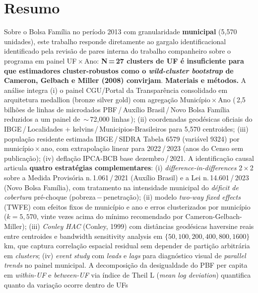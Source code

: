 \documentclass[12pt,a4paper,oneside]{article}
\begin{document}
\section*{Resumo}
\begin{singlespace}\small\noindent
Sobre o Bolsa Família no período 2013 com granularidade
\textbf{municipal} (5{,}570 unidades), este trabalho responde diretamente
ao gargalo identificacional identificado pela revisão de pares interna
do trabalho companheiro sobre o programa em painel UF\,$\times$\,Ano:
\textbf{N\,=\,27 clusters de UF é insuficiente para que estimadores
cluster-robustos como o \textit{wild-cluster bootstrap} de Cameron,
Gelbach e Miller (2008) convirjam}. \textbf{Materiais e métodos.} A
análise integra (i) o painel CGU/Portal da Transparência consolidado em
arquitetura medallion (bronze \textrightarrow{} silver \textrightarrow{}
gold) com agregação Município\,$\times$\,Ano (\,2{,}5\,bilhões de linhas
de microdados PBF\,/\,Auxílio Brasil\,/\,Novo Bolsa Família reduzidos a
um painel de \,$\sim$\,72{,}000 linhas\,); (ii) coordenadas geodésicas
oficiais do IBGE\,/\,Localidades + kelvins\,/\,Municipios-Brasileiros
para 5{,}570 centroides; (iii) população residente estimada
IBGE\,/\,SIDRA Tabela 6579 (variável 9324) por município\,$\times$\,ano,
com extrapolação linear para 2022\,/\,2023 (anos do Censo sem
publicação); (iv) deflação IPCA-BCB base dezembro\,/\,2021. A
identificação causal articula \textbf{quatro estratégias
complementares}: (i) \textit{difference-in-differences} 2\,$\times$\,2
sobre a Medida Provisória n.\,1.061\,/\,2021 (Auxílio Brasil) e a Lei
n.\,14.601\,/\,2023 (Novo Bolsa Família), com tratamento na intensidade
municipal do \textit{déficit de cobertura} pré-choque
(pobreza\,$-$\,penetração); (ii) modelo \textit{two-way fixed effects}
(TWFE) com efeitos fixos de município e ano e erros clusterizados por
município ($k = 5{,}570$, vinte vezes acima do mínimo recomendado por
Cameron-Gelbach-Miller); (iii) \textit{Conley HAC} (Conley, 1999) com
distâncias geodésicas haversine reais entre centroides e bandwidth
sensitivity analysis em $\{50, 100, 200, 400, 800, 1600\}$\,km, que
captura correlação espacial residual sem depender de partição
arbitrária em \textit{clusters}; (iv) \textit{event study} com
\textit{leads} e \textit{lags} para diagnóstico visual de
\textit{parallel trends} no painel municipal. A decomposição da
desigualdade do PBF per capita em \textit{within-UF} e
\textit{between-UF} via índice de Theil L (\textit{mean log
deviation}) quantifica quanto da variação ocorre dentro de UFs

\end{singlespace}
\end{document}

